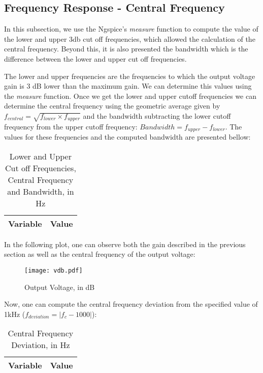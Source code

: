 \subsection{Frequency Response - Central Frequency}
\label{frequency_response}
\par In this subsection, we use the Ngspice's \textit{measure} function to compute the value of the lower and upper 3db cut off frequencies, which allowed the calculation of the central frequency. Beyond this, it is also presented the bandwidth which is the difference between the lower and upper cut off frequencies.
\par The lower and upper frequencies are the frequencies to which the output voltage gain is 3 dB lower than the maximum gain. We can determine this values using the \textit{measure} function. Once we get the lower and upper cutoff frequencies we can determine the central frequency using the geometric average given by $f_{central}=\sqrt{f_{lower}\times f_{upper}}$ and the bandwidth subtracting the lower cutoff frequency from the upper cutoff frequency: $Bandwidth = f_{upper}-f_{lower}$.
The values for these frequencies and the computed bandwidth are presented bellow:

\begin{table}[H]
  \centering
  \begin{tabular}{|l|r|}
    \hline    
    {\bf Variable} & {\bf Value} \\ \hline
    
  \end{tabular}
  \caption{Lower and Upper Cut off Frequencies, Central Frequency and Bandwidth, in Hz}
  \label{tab:frequencies}
\end{table}

\par In the following plot, one can observe both the gain described in the previous section as well as the central frequency of the output voltage:
\begin{figure}[H] \centering
  \texttt{[image: vdb.pdf]}
  \caption{Output Voltage, in dB}
  \label{fig:vdb}
\end{figure}

Now, one can compute the central frequency deviation from the specified value of 1kHz ($f_{deviation}=|f_c-1000|$):

\begin{table}[H]
  \centering
  \begin{tabular}{|l|r|}
    \hline    
    {\bf Variable} & {\bf Value} \\ \hline
    
  \end{tabular}
  \caption{Central Frequency Deviation, in Hz}
  \label{tab:frequency_dev}
\end{table}


